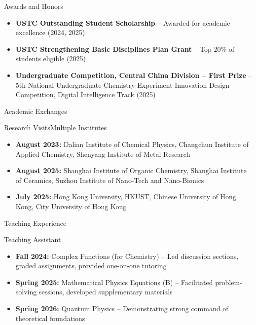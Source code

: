 \documentclass[]{mcdowellcv}
\begin{document}
\begin{cvsection}{Awards and Honors}
	\begin{cvsubsection}{}{}{}
		\begin{itemize}
			\item \textbf{USTC Outstanding Student Scholarship} -- Awarded for academic excellence (2024, 2025)
			\item \textbf{USTC Strengthening Basic Disciplines Plan Grant} -- Top 20\% of students eligible (2025)
			\item \textbf{Undergraduate Competition, Central China Division -- First Prize} -- 5th National Undergraduate Chemistry Experiment Innovation Design Competition, Digital Intelligence Track (2025)
		\end{itemize}
	\end{cvsubsection}
\end{cvsection}

\begin{cvsection}{Academic Exchanges}
	\begin{cvsubsection}{Research Visits}{Multiple Institutes}{}{}
		\begin{itemize}
			\item \textbf{August 2023:} Dalian Institute of Chemical Physics, Changchun Institute of Applied Chemistry, Shenyang Institute of Metal Research
			\item \textbf{August 2025:} Shanghai Institute of Organic Chemistry, Shanghai Institute of Ceramics, Suzhou Institute of Nano-Tech and Nano-Bionics
			\item \textbf{July 2025:} Hong Kong University, HKUST, Chinese University of Hong Kong, City University of Hong Kong
		\end{itemize}
	\end{cvsubsection}
\end{cvsection}

\begin{cvsection}{Teaching Experience}
	\begin{cvsubsection}{Teaching Assistant}{}{}{}
		\begin{itemize}
			\item \textbf{Fall 2024:} Complex Functions (for Chemistry) -- Led discussion sections, graded assignments, provided one-on-one tutoring
			\item \textbf{Spring 2025:} Mathematical Physics Equations (B) -- Facilitated problem-solving sessions, developed supplementary materials
			\item \textbf{Spring 2026:} Quantum Physics -- Demonstrating strong command of theoretical foundations
		\end{itemize}
	\end{cvsubsection}
\end{cvsection}
\end{document}
